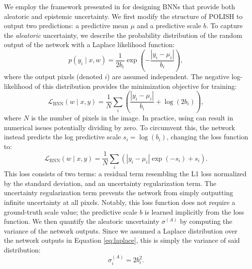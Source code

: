 \documentclass{article}
\begin{document}
We employ the framework presented in \citet{Kendall2017} for designing BNNs that provide both 
aleatoric and epistemic uncertainty. We first modify the structure of POLISH to output two predictions: a predictive mean $\mu$ and a predictive scale $b$. To capture the \textit{aleatoric} uncertainty, we describe the probability distribution of the random output of the network with a Laplace likelihood function:
\begin{equation}
\label{eq:laplace}
        p(y_i \mid x, w) = \frac{1}{2b_i}\exp \left(  - \frac{| y_i - \mu_i|}{b_i}  \right),
\end{equation}
where the output pixels (denoted $i$) are assumed independent.
The negative log-likelihood of this distribution provides the minimization objective for training:
\begin{equation}
    \mathcal{L}_{\text{BNN}}(w\mid x, y) = \frac{1}{N}\sum_{i}\left(\frac{| y_i - \mu_i|}{b_i} + \log (2b_i)\right),
    \label{eq:loss}
\end{equation}
where $N$ is the number of pixels in the image. In practice, using  can result in numerical issues potentially dividing by zero. To circumvent this, the network instead predicts the
log predictive scale $s_i = \log (b_i)$, changing the loss function to:
\begin{equation}
    \mathcal{L}_{\text{BNN}}(w\mid x, y) = \frac{1}{N}\sum_{i}\left(|y_i - \mu_i|\exp(-s_i) + s_i \right).
    \label{eq:loss_log}
\end{equation}
This loss consists of two terms: a residual term resembling the L1 loss normalized by the standard deviation, and an uncertainty regularization term. The uncertainty regularization term prevents the network from simply outputting infinite uncertainty at all pixels. Notably, this loss function does not require a ground-truth scale value; the predictive scale $b$ is learned
implicitly from the loss function.
We then quantify the aleatoric
uncertainty $\sigma^{(A)}$ by computing the variance of the network outputs. Since we assumed a Laplace distribution over the network outputs in Equation  \ref{eq:laplace}, this is simply the variance of said distribution:
\begin{equation}
    \sigma^{(A)}_i = 2b^2_i.
\end{equation}
\end{document}
